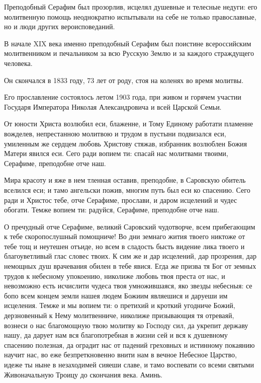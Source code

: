 Преподобный Серафим был прозорлив, исцелял душевные и телесные недуги: его молитвенную помощь неоднократно испытывали на себе не только православные, но и люди других вероисповеданий. 


В начале XIX века именно преподобный Серафим был поистине всероссийским молитвенником и печальником за всю Русскую Землю и за каждого страждущего человека. 


Он скончался в 1833 году, 73 лет от роду, стоя на коленях во время молитвы. 


Его прославление состоялось летом 1903 года, при живом и горячем участии Государя Императора Николая Александровича и всей Царской Семьи.




От юности Христа возлюбил еси, блаженне, и Тому Единому работати пламенне вожделев, непрестанною молитвою и трудом в пустыни подвизался еси, умиленным же сердцем любовь Христову стяжав, избранник возлюблен Божия Матери явился еси. Сего ради вопием ти: спасай нас молитвами твоими, Серафиме, преподобне отче наш.





Мира красоту и яже в нем тленная оставив, преподобне, в Саровскую обитель вселился еси; и тамо ангельски пожив, многим путь был еси ко спасению. Сего ради и Христос тебе, отче Серафиме, прослави, и даром исцелений и чудес обогати. Темже вопием ти: радуйся, Серафиме, преподобне отче наш.




О пречудный отче Серафиме, великий Саровский чудотворче, всем прибегающим к тебе скоропослушный помощниче! Во дни земнаго жития твоего никтоже от тебе тощ и неутешен отъиде, но всем в сладость бысть видение лика твоего и благоуветливый глас словес твоих. К сим же и дар исцелений, дар прозрения, дар немощных душ врачевания обилен в тебе явися. Егда же призва тя Бог от земных трудов к небесному упокоению, николиже любовь твоя преста от нас, и невозможно есть исчислити чудеса твоя умножившаяся, яко звезды небесныя: се бопо всем концем земли нашея людем Божиим являешися и даруеши им исцеления. Темже и мы вопием ти: о претихий и кроткий угодниче Божий, дерзновенный к Нему молитвенниче, николиже призывающия тя отреваяй, вознеси о нас благомощную твою молитву ко Господу сил, да укрепит державу нашу, да дарует нам вся благопотребная в жизни сей и вся к душевному спасению полезная, да оградит нас от падений греховных и истинному покаянию научит нас, во еже безпреткновенно внити нам в вечное Небесное Царство, идеже ты ныне в незаходимей сияеши славе, и тамо воспевати со всеми святыми Живоначальную Троицу до скончания века. Аминь.


